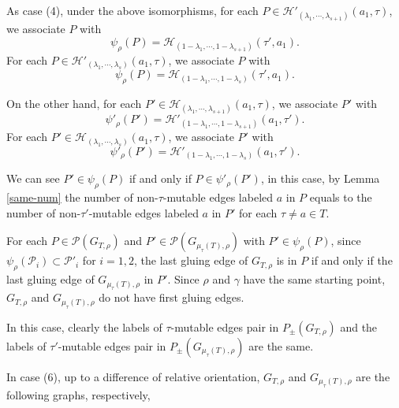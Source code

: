 \documentclass[10pt]{amsart}
\theoremstyle{theorems}
\begin{document}
\medskip

As case (4), under the above isomorphisms, for each $P\in \mathcal H'_{(\lambda_1,\cdots,\lambda_{s+1})}(a_1,\tau)$, we associate $P$ with
$$\psi_{\rho}(P)=\mathcal H_{(1-\lambda_1,\cdots,1-\lambda_{s+1})}(\tau',a_1).$$ For each $P\in \mathcal H'_{(\lambda_1,\cdots,\lambda_{s})}(a_1,\tau)$, we associate $P$ with
$$\psi_{\rho}(P)=\mathcal H_{(1-\lambda_1,\cdots,1-\lambda_{s})}(\tau',a_1).$$

On the other hand, for each $P'\in \mathcal H_{(\lambda_1,\cdots,\lambda_{s+1})}(a_1,\tau)$, we associate $P'$ with $$\psi'_{\rho}(P')=\mathcal H'_{(1-\lambda_1,\cdots,1-\lambda_{s+1})}(a_1,\tau').$$ For each $P'\in \mathcal H_{(\lambda_1,\cdots,\lambda_{s})}(a_1,\tau)$, we associate $P'$ with $$\psi'_{\rho}(P')=\mathcal H'_{(1-\lambda_1,\cdots,1-\lambda_{s})}(a_1,\tau').$$

We can see $P'\in \psi_{\rho}(P)$ if and only if $P\in \psi'_{\rho}(P')$, in this case, by Lemma \ref{same-num} the number of non-$\tau$-mutable edges labeled $a$ in $P$ equals to the number of non-$\tau'$-mutable edges labeled $a$ in $P'$ for each $\tau\neq a\in T$.

\medskip

For each $P\in \mathcal P(G_{T,\rho})$ and $P'\in \mathcal P(G_{\mu_{\tau}(T),\rho})$ with $P'\in \psi_{\rho}(P)$, since $\psi_{\rho}(\mathcal P_i)\subset \mathcal P'_i$ for $i=1,2$, the last gluing edge of $G_{T,\rho}$ is in $P$ if and only if the last gluing edge of $G_{\mu_{\tau}(T),\rho}$ in $P'$. Since $\rho$ and $\gamma$ have the same starting point, $G_{T,\rho}$ and $G_{\mu_{\tau}(T),\rho}$ do not have first gluing edges.

\medskip

In this case, clearly the labels of $\tau$-mutable edges pair in $P_{\pm}(G_{T,\rho})$ and the labels of $\tau'$-mutable edges pair in $P_{\pm}(G_{\mu_{\tau}(T),\rho})$ are the same.

\medskip

In case (6), up to a difference of relative orientation, $G_{T,\rho}$ and $G_{\mu_{\tau}(T),\rho}$ are the following graphs, respectively,
\end{document}
